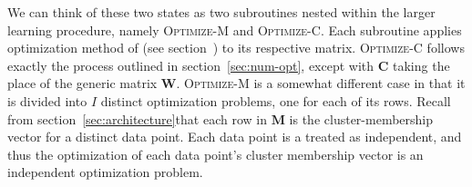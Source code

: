 We can think of these two states as two subroutines nested within the larger learning procedure, namely
\textsc{Optimize-M} and \textsc{Optimize-C}. Each subroutine applies optimization method of \citet{cheng-and-li:2012} (see section~) to its respective matrix. \textsc{Optimize-C} follows exactly the process outlined in section~\ref{sec:num-opt}, except with  $\textbf{C}$ taking the place of the generic matrix $\textbf{W}$. 
\textsc{Optimize-M} is a somewhat different case in that it is divided 
into $I$ distinct optimization problems, one for each of its rows. Recall from section~\ref{sec:architecture}that  each row in $\textbf{M}$ is the cluster-membership vector for a distinct data point. Each data point is a treated as independent, and thus the optimization of each data point's cluster membership vector is an independent optimization problem. 





